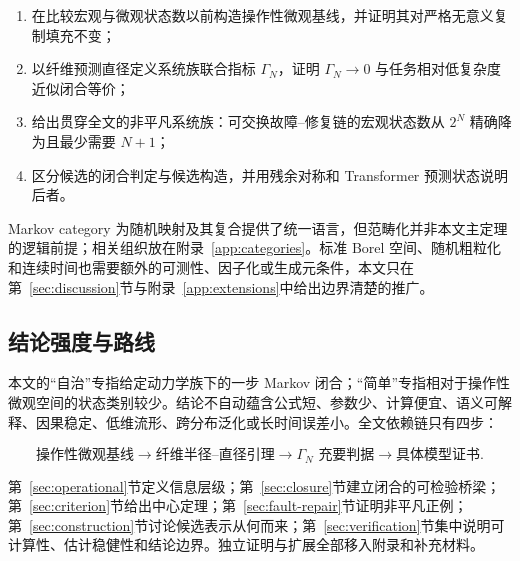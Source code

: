 \begin{enumerate}
  \item 在比较宏观与微观状态数以前构造操作性微观基线，并证明其对严格无意义复制填充不变；
  \item 以纤维预测直径定义系统族联合指标 $\Gamma_N$，证明 $\Gamma_N\to0$ 与任务相对低复杂度近似闭合等价；
  \item 给出贯穿全文的非平凡系统族：可交换故障--修复链的宏观状态数从 $2^N$ 精确降为且最少需要 $N+1$；
  \item 区分候选的闭合判定与候选构造，并用残余对称和 Transformer 预测状态说明后者。
\end{enumerate}

Markov category 为随机映射及其复合提供了统一语言\citep{Fritz2020}，但范畴化并非本文主定理的逻辑前提；相关组织放在附录~\ref{app:categories}。标准 Borel 空间、随机粗粒化和连续时间也需要额外的可测性、因子化或生成元条件，本文只在第~\ref{sec:discussion}节与附录~\ref{app:extensions}中给出边界清楚的推广。

\subsection{结论强度与路线}

本文的“自治”专指给定动力学族下的一步 Markov 闭合；“简单”专指相对于操作性微观空间的状态类别较少。结论不自动蕴含公式短、参数少、计算便宜、语义可解释、因果稳定、低维流形、跨分布泛化或长时间误差小。全文依赖链只有四步：

\[
\text{操作性微观基线}
\longrightarrow
\text{纤维半径--直径引理}
\longrightarrow
\Gamma_N\text{ 充要判据}
\longrightarrow
\text{具体模型证书}.
\]

第~\ref{sec:operational}节定义信息层级；第~\ref{sec:closure}节建立闭合的可检验桥梁；第~\ref{sec:criterion}节给出中心定理；第~\ref{sec:fault-repair}节证明非平凡正例；第~\ref{sec:construction}节讨论候选表示从何而来；第~\ref{sec:verification}节集中说明可计算性、估计稳健性和结论边界。独立证明与扩展全部移入附录和补充材料。
